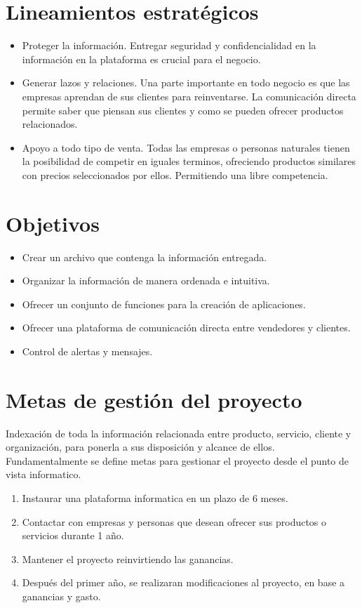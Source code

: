\documentclass[letterpaper,openright,10pt,oneside]{report}
\begin{document}
		\section{Lineamientos estratégicos}
			\begin{itemize}
				\item Proteger la información. \newline
					Entregar seguridad y confidencialidad en la información en la plataforma es crucial para el negocio. 
				\item Generar lazos y relaciones. \newline
				Una parte importante en todo negocio es que las empresas aprendan de sus clientes para reinventarse. La comunicación directa permite saber que piensan sus clientes y como se pueden ofrecer productos relacionados.
				\item Apoyo a todo tipo de venta. \newline
				Todas las empresas o personas naturales tienen la posibilidad de competir en iguales terminos, ofreciendo productos similares con precios seleccionados por ellos. Permitiendo una libre competencia.
			\end{itemize}
		\section{Objetivos}
			\begin{itemize}
				\item Crear un archivo que contenga la información entregada.
				\item Organizar la información de manera ordenada e intuitiva.
				\item Ofrecer un conjunto de funciones para la creación de aplicaciones.
				\item Ofrecer una plataforma de comunicación directa entre vendedores y clientes.
				\item Control de alertas y mensajes.
			\end{itemize}
		\section{Metas de gestión del proyecto}
			Indexación de toda la información relacionada entre producto, servicio, cliente y organización, para ponerla a sus disposición y alcance de ellos. Fundamentalmente se define metas para gestionar el proyecto desde el punto de vista informatico.
			\begin{enumerate}
				\item Instaurar una plataforma informatica en un plazo de 6 meses.
				\item Contactar con empresas y personas que desean ofrecer sus productos o servicios durante 1 año.
				\item Mantener el proyecto reinvirtiendo las ganancias.
				\item Después del primer año, se realizaran modificaciones al proyecto, en base a ganancias y gasto.	
			\end{enumerate}
\end{document}
